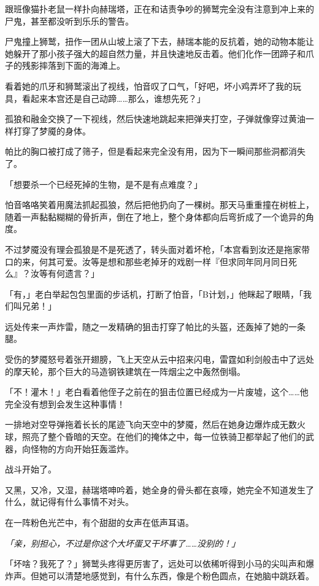 跟班像猫扑老鼠一样扑向赫瑞塔，正在和诘责争吵的狮鹫完全没有注意到冲上来的尸鬼，甚至都没听到乐乐的警告。

尸鬼撞上狮鹫，扭作一团从山坡上滚了下去，赫瑞本能的反抗着，她的动物本能让她躲开了那小孩子强大的超自然力量，并且快速地反击着。他们化作一团蹄子和爪子的残影摔落到下面的海滩上。

看着她的爪牙和狮鹫滚出了视线，怕音叹了口气，「好吧，坏小鸡弄坏了我的玩具，看起来本宫还是自己动蹄……那么，谁想先死？」

孤狼和融金交换了一下视线，然后快速地跳起来把弹夹打空，子弹就像穿过黄油一样打穿了梦魇的身体。

帕比的胸口被打成了筛子，但是看起来完全没有用，因为下一瞬间那些洞都消失了。

「想要杀一个已经死掉的生物，是不是有点难度？」

怕音咯咯笑着用魔法抓起孤狼，然后把他扔向了一棵树。那天马重重撞在树桩上，随着一声黏黏糊糊的骨折声，倒在了地上，整个身体都向后弯折成了一个诡异的角度。

不过梦魇没有理会孤狼是不是死透了，转头面对着坏枪，「本宫看到汝还是拖家带口的来，何其可爱。汝等是想和那些老掉牙的戏剧一样『但求同年同月同日死么』？汝等有何遗言？」

「有，」老白举起包包里面的步话机，打断了怕音，「B计划，」他眯起了眼睛，「我们叫兄弟！」

远处传来一声炸雷，随之一发精确的狙击打穿了帕比的头盔，还轰掉了她的一条腿。

受伤的梦魇怒号着张开翅膀，飞上天空从云中招来闪电，雷霆如利剑般击中了远处的摩天轮，那个巨大的马造钢铁建筑在一阵烟尘之中轰然倒塌。

「不！灌木！」老白看着他侄子之前在的狙击位置已经成为一片废墟，这个……他完全没有想到会发生这种事情！

一排地对空导弹拖着长长的尾迹飞向天空中的梦魇，然后在她身边爆炸成无数火球，照亮了整个昏暗的天空。在他们的掩体之中，每一位铁骑卫都举起了他们的武器，向怪物的方向开始狂轰滥炸。

战斗开始了。

\horizonline

又黑，又冷，又湿，赫瑞塔呻吟着，她全身的骨头都在哀嚎，她完全不知道发生了什么，就记得有什么事情不对头。

在一阵粉色光芒中，有个甜甜的女声在低声耳语。

\emph{「亲，别担心，不过是你这个大坏蛋又干坏事了……没别的！」}

「坏啥？我死了？」狮鹫头疼得更厉害了，远处可以依稀听得到小马的尖叫声和爆炸声。但她可以清楚地感觉到，有什么东西，像是个粉色圆点，在她脑中跳跃着。

